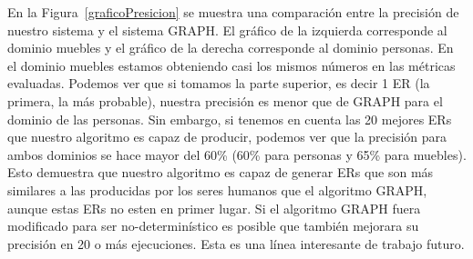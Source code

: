 En la Figura~\ref{graficoPresicion} se muestra una comparaci\'on entre la precisi\'on de nuestro sistema y el sistema GRAPH. El gr\'afico de la izquierda corresponde al dominio muebles y el gr\'afico de la derecha corresponde al dominio personas. En el dominio muebles estamos obteniendo casi los mismos n\'umeros en las m\'etricas evaluadas.
Podemos ver que si tomamos la parte superior, es decir 1 ER (la primera, la m\'as probable), nuestra precisi\'on es menor que de GRAPH para el dominio de las personas. Sin embargo, si tenemos en cuenta las 20 mejores ERs que nuestro algoritmo es capaz de producir, podemos ver que la precisi\'on para ambos dominios se hace mayor del 60\% (60\% para personas y 65\% para muebles). Esto demuestra que nuestro algoritmo es capaz de generar ERs que son m\'as similares a las producidas por los seres humanos que el algoritmo GRAPH, aunque estas ERs no esten en primer lugar. Si el algoritmo GRAPH fuera modificado para ser no-determin\'istico es posible que tambi\'en mejorara su precisi\'on en 20 o m\'as ejecuciones. Esta es una l\'inea interesante de trabajo futuro. 
